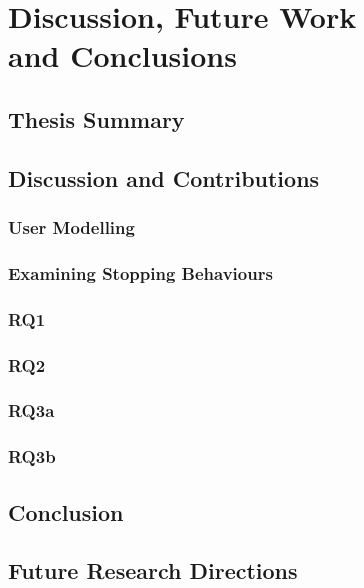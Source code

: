
\chapter[Discussion, Future Work and Conclusions]{Discussion, Future Work\\and Conclusions}\label{chap:conclusions}


\section{Thesis Summary}



\section{Discussion and Contributions}

\subsection{User Modelling}
\subsection{Examining Stopping Behaviours}

\subsection{RQ1}

\subsection{RQ2}

\subsection{RQ3a}

\subsection{RQ3b}

\section{Conclusion}

\section{Future Research Directions}


